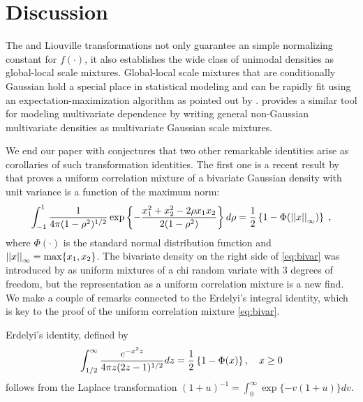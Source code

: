 \documentclass[lineno]{biometrika}
\begin{document}
\section{Discussion}
\label{sec:discussion}

The \CS{} and Liouville transformations not only guarantee an simple normalizing constant for $f(\cdot)$, it also establishes the wide class of unimodal densities as global-local scale mixtures. Global-local scale mixtures that are conditionally Gaussian hold a special place in statistical modeling and can be rapidly fit using an expectation-maximization algorithm as
pointed out by \cite{polson_data_2013}. \cite{palmer_amica:_2011} provides a similar tool for modeling multivariate dependence by writing general non-Gaussian multivariate densities as multivariate Gaussian scale mixtures. %

We end our paper with conjectures that two other remarkable identities arise as corollaries of such transformation identities. The first one is a recent result by \cite{zhang2014uniform} that proves a uniform correlation mixture of a bivariate Gaussian density with unit variance is a function of the maximum norm: 
\begin{equation}
  \int_{-1}^{1} \frac{1}{4 \pi (1-\rho^2)^{1/2} } 
  \exp\left\{ - \frac{x_1^2 + x_2^2 - 2 \rho x_1 x_2}{2 (1-\rho^2)} \right\} d\rho = 
  \half \left\{1- \Phi(\vectornorm{x}_{\infty})\right\} 
  \;, 
  \label{eq:bivar}
\end{equation}
where $\Phi(\cdot)$ is the standard normal distribution function and $\left|\left|x\right|\right|_{\infty} = \max\{ x_1, x_2\}$. The bivariate density on the
right side of \eqref{eq:bivar} was introduced by \citet{bryson1982constructing} as uniform mixtures of a chi random variate with 3 degrees of freedom, but the representation as a uniform correlation mixture is a new find.  We make a couple of remarks connected to the Erdelyi's integral identity, which is key to the proof of the uniform correlation mixture \eqref{eq:bivar}. 
\begin{theorem}
Erdelyi's identity, defined by
\begin{equation}
  \int_{1/2}^{\infty} \frac{e^{-x^2 z}}{4 \pi z 	(2z-1)^{1/2}} dz = \half \left\{1-\Phi(x)\right\}, \quad x \geq 0 \label{eq:erdelyi}
\end{equation}
follows from the Laplace transformation $(1+u)^{-1} = \int_0^{\infty} \exp\{-v(1+u)\} dv$. 
\end{theorem}
\end{document}
